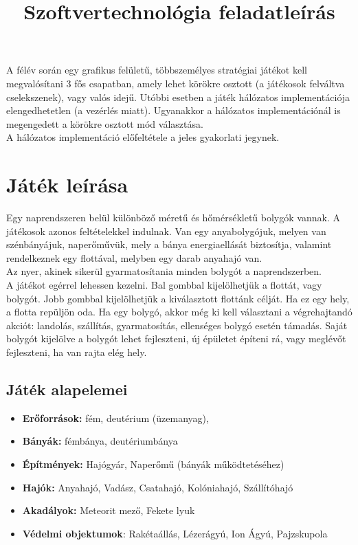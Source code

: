 \documentclass[12pt,a4paper]{article}
\title{Szoftvertechnológia feladatleírás}
\begin{document}
\maketitle
A félév során egy grafikus felületű, többszemélyes stratégiai játékot kell megvalósítani 3 fős csapatban, amely lehet körökre osztott (a játékosok felváltva cselekszenek), vagy valós idejű. Utóbbi esetben a játék hálózatos implementációja elengedhetetlen (a vezérlés miatt). Ugyanakkor a hálózatos implementációnál is megengedett a körökre osztott mód választása. \\

A hálózatos implementáció előfeltétele a jeles gyakorlati jegynek.

\section{Játék leírása}
Egy naprendszeren belül különböző méretű és hőmérsékletű bolygók vannak. A játékosok azonos feltételekkel indulnak. Van egy anyabolygójuk, melyen van szénbányájuk, naperőművük, mely a bánya energiaellását biztosítja, valamint rendelkeznek egy flottával, melyben egy darab anyahajó van. \\

Az nyer, akinek sikerül gyarmatosítania minden bolygót a naprendszerben. \\

A játékot egérrel lehessen kezelni. Bal gombbal kijelölhetjük a flottát, vagy bolygót. Jobb gombbal kijelölhetjük a kiválasztott flottánk célját. Ha ez egy hely, a flotta repüljön oda. Ha egy bolygó, akkor még ki kell választani a végrehajtandó akciót: landolás, szállítás, gyarmatosítás, ellenséges bolygó esetén támadás. Saját bolygót kijelölve a bolygót lehet fejleszteni, új épületet építeni rá, vagy meglévőt fejleszteni, ha van rajta elég hely. \\

\subsection{Játék alapelemei}
\begin{itemize}
\item \textbf{Erőforrások:} fém, deutérium (üzemanyag), 
\item \textbf{Bányák:} fémbánya, deutériumbánya
\item \textbf{Építmények:} Hajógyár, Naperőmű (bányák működtetéséhez)
\item \textbf{Hajók:} Anyahajó, Vadász, Csatahajó, Kolóniahajó, Szállítóhajó
\item \textbf{Akadályok:} Meteorit mező, Fekete lyuk
\item \textbf{Védelmi objektumok}: Rakétaállás, Lézerágyú, Ion Ágyú, Pajzskupola
\end{itemize}
\end{document}
